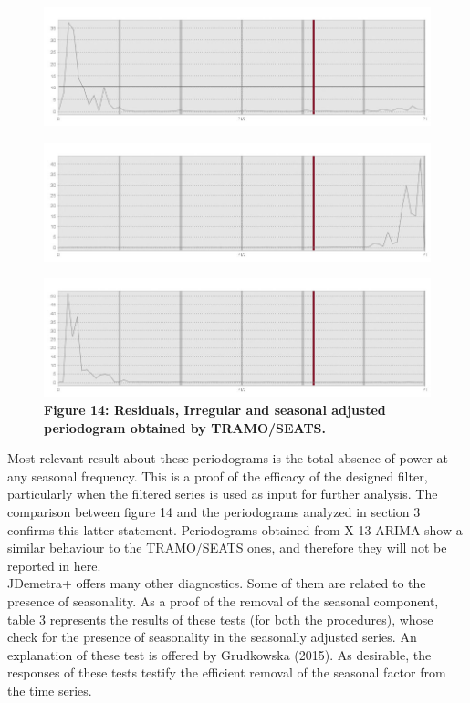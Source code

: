 \documentclass{article}
\begin{document}
\begin{figure}[H]
  \includegraphics[width=\textwidth]{../images/capitolo4/TSresper.jpg}
\end{figure}
\begin{figure}[H]
  \includegraphics[width=\textwidth]{../images/capitolo4/TSirrper.jpg}
\end{figure} 
\begin{figure}[H]
  \includegraphics[width=\textwidth]{../images/capitolo4/TSsaper.jpg}
  {\textbf{\scriptsize Figure 14: Residuals, Irregular and seasonal adjusted periodogram obtained by TRAMO/SEATS.}}
\end{figure}
Most relevant result about these periodograms is the total absence of power at any seasonal frequency. This is a proof of the efficacy of the designed filter, particularly when the filtered series is used as input for further analysis. The comparison between figure 14 and the periodograms analyzed in section 3 confirms this latter statement. Periodograms obtained from X-13-ARIMA show a similar behaviour to the TRAMO/SEATS ones, and therefore they will not be reported in here.\\JDemetra+ offers many other diagnostics. Some of them are related to the presence of seasonality. As a proof of the removal of the seasonal component, table 3 represents the results of these tests (for both the procedures), whose check for the presence of seasonality in the seasonally adjusted series. An explanation of these test is offered by Grudkowska (2015). As desirable, the responses of these tests testify the efficient removal of the seasonal factor from the time series.
\end{document}
